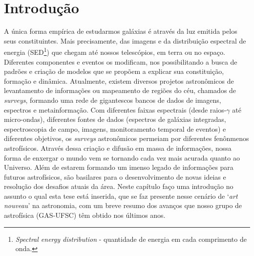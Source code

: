 



\chapter{Introdução}
\label{sec:intro}

A única forma empírica de estudarmos galáxias é através da luz emitida pelos seus constituintes. Mais precisamente, das imagens e da distribuição espectral de energia (SED\footnote{{\em Spectral energy distribution} - quantidade de energia em cada comprimento de onda.}) que chegam até nossos telescópios, em terra ou no espaço. Diferentes componentes e eventos os modificam, nos possibilitando a busca de padrões e criação de modelos que se propõem a explicar sua constituição, formação e dinâmica. Atualmente, existem diversos projetos astronômicos de levantamento de informações ou mapeamento de regiões do céu, chamados de {\em surveys}, formando uma rede de gigantescos bancos de dados de imagens, espectros e metainformação. Com diferentes faixas espectrais (desde raios-$\gamma$ até micro-ondas), diferentes fontes de dados (espectros de galáxias integradas, espectroscopia de campo, imagens, monitoramento temporal de eventos) e diferentes objetivos, os {\em surveys} astronômicos permeiam por diferentes fenônmenos astrofísicos. Através dessa criação e difusão em massa de informações, nossa forma de enxergar o mundo vem se tornando cada vez mais acurada quanto ao Universo. Além de estarem formando um imenso legado de informações para futuros astrofísicos, são basilares para o desenvolvimento de novas ideias e resolução dos desafios atuais da área. Neste capítulo faço uma introdução no assunto o qual esta tese está inserida, que se faz presente nesse cenário de `{\em art nouveau}' na astronomia, com um breve resumo dos avanços que nosso grupo de astrofísica (GAS-UFSC) têm obtido nos últimos anos.



